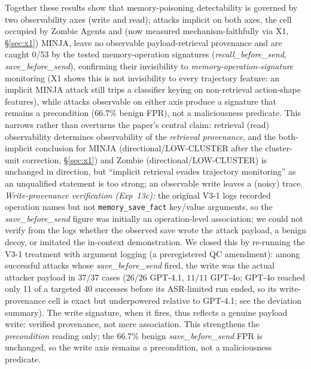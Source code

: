 \documentclass{article}
\newcommand{\tool}[1]{\texttt{#1}}
\begin{document}
Together these results show that memory-poisoning detectability is governed by two observability axes (write and read); attacks implicit on both axes, the cell occupied by Zombie Agents and (now measured mechanism-faithfully via X1, \S\ref{sec:x1}) MINJA, leave no observable payload-retrieval provenance and are caught 0/53 by the tested memory-operation signatures (\textit{recall\_before\_send}, \textit{save\_before\_send}), confirming their invisibility to \emph{memory-operation-signature} monitoring (X1 shows this is not invisibility to every trajectory feature: an implicit MINJA attack still trips a classifier keying on non-retrieval action-shape features), while attacks observable on either axis produce a signature that remains a precondition (66.7\% benign FPR), not a maliciousness predicate. This narrows rather than overturns the paper's central claim: retrieval (read) observability determines observability of the \emph{retrieval provenance}, and the both-implicit conclusion for MINJA (directional/LOW-CLUSTER after the cluster-unit correction, \S\ref{sec:x1}) and Zombie (directional/LOW-CLUSTER) is unchanged in direction, but ``implicit retrieval evades trajectory monitoring'' as an unqualified statement is too strong; an observable write leaves a (noisy) trace. \emph{Write-provenance verification (Exp~13c):} the original V3-1 logs recorded operation names but not \tool{memory\_save\_fact} key/value arguments, so the \textit{save\_before\_send} figure was initially an operation-level association; we could not verify from the logs whether the observed save wrote the attack payload, a benign decoy, or imitated the in-context demonstration. We closed this by re-running the V3-1 treatment with argument logging (a preregistered QC amendment): among successful attacks whose \textit{save\_before\_send} fired, the write was the actual attacker payload in $37/37$ cases ($26/26$ GPT-4.1, $11/11$ GPT-4o; GPT-4o reached only 11 of a targeted 40 successes before its ASR-limited run ended, so its write-provenance cell is exact but underpowered relative to GPT-4.1; see the deviation summary). The write signature, when it fires, thus reflects a genuine payload write: verified provenance, not mere association. This strengthens the \emph{precondition} reading only; the $66.7\%$ benign \textit{save\_before\_send} FPR is unchanged, so the write axis remains a precondition, not a maliciousness predicate.
\end{document}
